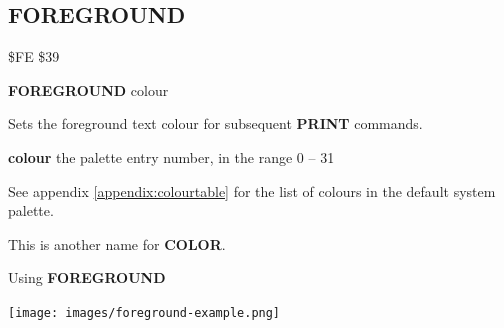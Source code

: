\newpage
\subsection{FOREGROUND}
\begin{description}[leftmargin=2cm,style=nextline]
\item [Token:] \$FE \$39
\item [Format:] {\bf FOREGROUND} colour
\item [Usage:] Sets the foreground text colour for subsequent {\bf PRINT} commands.

               {\bf colour} the palette entry number, in the range 0 -- 31

               See appendix \vref{appendix:colourtable}
               for the list of colours in the default system palette.

\item [Remarks:] This is another name for {\bf COLOR}.

\item [Example:] Using {\bf FOREGROUND}
\item \begin{center}\texttt{[image: images/foreground-example.png]}\end{center}
\end{description}


\newpage
